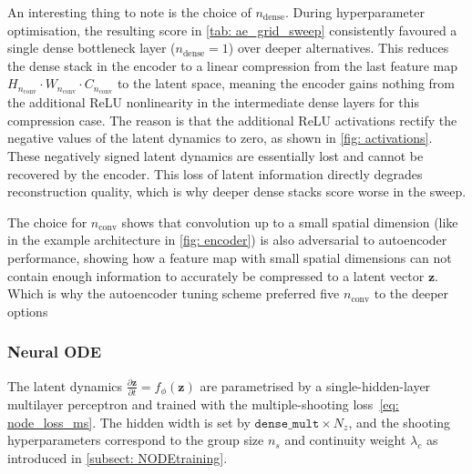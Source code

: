 An interesting thing to note is the choice of $n_\text{dense}$. During hyperparameter optimisation, the resulting score in \autoref{tab: ae_grid_sweep} consistently favoured a single dense bottleneck layer ($n_\text{dense}=1$) over deeper alternatives. This reduces the dense stack in the encoder to a linear compression from the last feature map $H_{n_\text{conv}}\!\cdot\! W_{n_\text{conv}}\!\cdot\! C_{n_\text{conv}}$ to the latent space, meaning the encoder gains nothing from the additional ReLU nonlinearity in the intermediate dense layers for this compression case. The reason is that the additional ReLU activations rectify the negative values of the latent dynamics to zero, as shown in \autoref{fig: activations}. These negatively signed latent dynamics are essentially lost and cannot be recovered by the encoder. This loss of latent information directly degrades reconstruction quality, which is why deeper dense stacks score worse in the sweep.


The choice for $n_\text{conv}$ shows that convolution up to a small spatial dimension (like in the example architecture in \autoref{fig: encoder}) is also adversarial to autoencoder performance, showing how a feature map with small spatial dimensions can not contain enough information to accurately be compressed to a latent vector $\mathbf{z}$. Which is why the autoencoder tuning scheme preferred five $n_\text{conv}$ to the deeper options


\subsubsection{Neural ODE}
\label{subsubsect: 4_baseline_node}

The latent dynamics $\frac{\partial{\mathbf{z}}}{\partial t} = f_\phi(\mathbf{z})$ are parametrised by a single-hidden-layer multilayer perceptron and trained with the multiple-shooting loss~\eqref{eq: node_loss_ms}. The hidden width is set by $\texttt{dense\_mult}\times N_z$, and the shooting hyperparameters correspond to the group size $n_s$ and continuity weight $\lambda_c$ as introduced in \autoref{subsect: NODEtraining}. 

